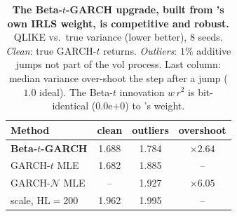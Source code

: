 \begin{table}[t]\centering\small
\setlength{\tabcolsep}{4pt}
\caption{\textbf{The Beta-$t$-GARCH upgrade, built from \cafe{}'s own IRLS weight, is competitive and robust.} QLIKE vs.\ true variance (lower better), 8 seeds. \emph{Clean}: true GARCH-$t$ returns. \emph{Outliers}: $1\%$ additive jumps not part of the vol process. Last column: median variance over-shoot the step after a jump ($1.0$ ideal). The Beta-$t$ innovation $w\,r^2$ is bit-identical ($0.0$e$+$0) to \cafe{}'s weight.}
\label{tab:betat}
\begin{tabular}{@{}lccc@{}}\toprule
Method & clean & outliers & overshoot \\\midrule
\textbf{Beta-$t$-GARCH} & 1.688 & 1.784 & $\times2.64$ \\
GARCH-$t$ MLE & 1.682 & 1.885 & -- \\
GARCH-$\mathcal{N}$ MLE & -- & 1.927 & $\times6.05$ \\
\cafe{} scale, HL$=$200 & 1.962 & 1.995 & -- \\
\bottomrule\end{tabular}
\end{table}